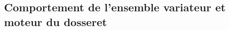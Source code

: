 \documentclass[10pt,fleqn]{article} %
\begin{document}
\begin{multicols}{2}



%
%
%
%

\subsection*{Comportement de l'ensemble variateur et moteur du dosseret}


\end{multicols}
\end{document}
